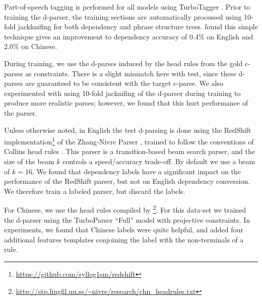 \documentclass[11pt,letterpaper]{article}
\DeclareMathOperator*{\argmin}{arg\,min}
\newcommand{\lpkcomment}[1]{\textcolor{red}{\bf \small [#1 --lpk]}}
\begin{document}
Part-of-speech tagging is performed for all models using TurboTagger
\cite{martins2013turning}.  Prior to training the d-parser, the
training sections are automatically processed using 10-fold
jackknifing \cite{collins2005discriminative} for both dependency and phrase
structure trees.  found this simple technique
gives an improvement to dependency accuracy of 0.4\% on English and
2.0\% on Chinese. 

During training, we use the d-parses induced by the head rules from
the gold c-parses as constraints. There is a slight mismatch here with
test, since these d-parses are guaranteed to be consistent with the
target c-parse. We also experimented with using 10-fold jacknifing of
the d-parser during training to produce more realistic parses; however, 
we found that this hurt performance of the parser.


Unless otherwise noted, in English the test d-parsing is done using
the RedShift
implementation\footnote{\url{https://github.com/syllog1sm/redshift}}
of the Zhang-Nivre Parser \cite{zhang2011transition}, trained to
follow the conventions of Collins head rules
\cite{collins2003head}. This parser is a transition-based beam search
parser, and the size of the beam $k$ controls a speed/accuracy
trade-off.  By default we use a beam of $k=16$.  We found that
dependency labels have a significant impact on the performance of the
RedShift parser, but not on English dependency conversion. We therefore train
a labeled parser, but discard the labels.

For Chinese, we use the head rules compiled by
\footnote{\url{http://stp.lingfil.uu.se/~nivre/research/chn_headrules.txt}}.
For this data-set we trained the d-parser using the TurboParser
``Full'' model with projective constraints. In experiments, we
found that Chinese labels were quite helpful, and added four
additional features templates conjoining the label with the
non-terminals of a rule.




\end{document}
